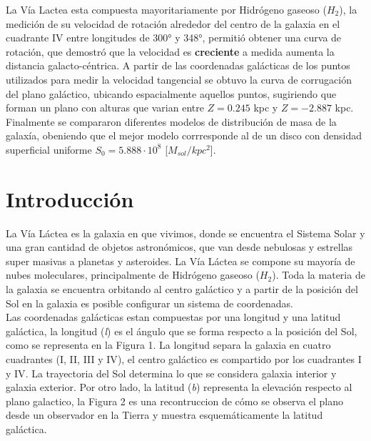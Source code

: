 \documentclass[letterpaper,oneside]{article}
\begin{document}
	
\templatePortrait

\templatePagecfg

\begin{resumen}
La Vía Lactea esta compuesta mayoritariamente por Hidrógeno gaseoso ($H_2$), la medición de su velocidad de rotación alrededor del centro de la galaxia en el cuadrante \textrm{IV} entre longitudes de 300° y 348°, permitió obtener una curva de rotación, que demostró que la velocidad es \textbf{creciente} a medida aumenta la distancia galacto-céntrica. A partir de las coordenadas galácticas de los puntos utilizados para medir la velocidad tangencial se obtuvo la curva de corrugación del plano galáctico, ubicando espacialmente aquellos puntos, sugiriendo que forman un plano con alturas que varian entre $Z=0.245$ kpc y $Z=-2.887$ kpc.\\

Finalmente se compararon diferentes modelos de distribución de masa de la galaxía, obeniendo que el mejor modelo corrresponde al de un disco con densidad superficial uniforme $S_0 = 5.888 \cdot 10^{8}$ [$M_{sol}/kpc^{2}$].
\end{resumen}


\templateFinalcfg


\section{Introducción}
La Vía Láctea es la galaxia en que vivimos, donde se encuentra el Sistema Solar y una gran cantidad de objetos astronómicos, que van desde nebulosas y estrellas super masivas a planetas y asteroides. La Vía Láctea se compone su mayoría de nubes moleculares, principalmente de Hidrógeno gaseoso ($H_2$). Toda la materia de la galaxia se encuentra orbitando al centro galáctico y a partir de la posición del Sol en la galaxia es posible configurar un sistema de coordenadas.\\

Las coordenadas galácticas estan compuestas por una longitud y una latitud galáctica, la longitud (\emph{l}) es el ángulo que se forma respecto a la posición del Sol, como se representa en la Figura 1. La longitud separa la galaxia en cuatro cuadrantes (\textrm{I}, \textrm{II}, \textrm{III} y \textrm{IV}), el centro galáctico es compartido por los cuadrantes \textrm{I} y \textrm{IV}. La trayectoria del Sol determina lo que se considera galaxia interior y galaxia exterior. Por otro lado, la latitud (\emph{b}) representa la elevación respecto al plano galactico, la Figura 2 es una recontruccion de cómo se observa el plano desde un observador en la Tierra y muestra esquemáticamente la latitud galáctica.
\end{document}
